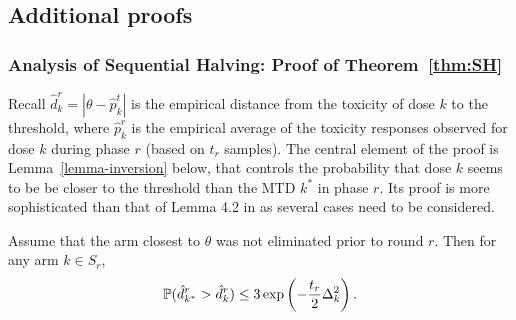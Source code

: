 
\subsection*{Additional proofs}
\subsubsection{Analysis of Sequential Halving: Proof of Theorem~\ref{thm:SH}}
\label{sec:SHproof}

Recall $\hat{d}_k^r = |\theta - \hat{p}_k^t|$ is the empirical distance from the toxicity of dose $k$ to the threshold, where $\hat{p}_k^r$ is the empirical average of the toxicity responses observed for dose $k$ during phase $r$ (based on $t_r$ samples). The central element of the proof is Lemma~\ref{lemma-inversion} below, that controls the probability that dose $k$ seems to be be closer to the threshold than the MTD $k^*$ in phase $r$. Its proof is more sophisticated than that of Lemma 4.2 in \cite{Karnin13} as several cases need to be considered. 
%
%
\begin{lemma}
\label{lemma-inversion}
Assume that the arm closest to $\theta$ was not eliminated
prior to round $r$.
Then for any arm $k \in S_r$,
\begin{equation}\mathbb{P}(\hat{d}^r_{k^*} > \hat{d}^r_k) \leq 3 \exp\left(- \frac{t_r}{2}\Delta_k^2\right).\label{toproofin4case}\end{equation}
\end{lemma}
%
%
